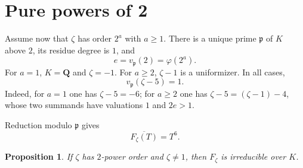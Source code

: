 \documentclass[11pt]{article}
\newtheorem{proposition}[theorem]{Proposition}
\newcommand{\Q}{\mathbf Q}
\begin{document}
\section{Pure powers of 2}
\label{sec:pure-two-base}

Assume now that $\zeta$ has order $2^a$ with $a\geq1$.  There is a
unique prime $\mathfrak p$ of $K$ above $2$, its residue degree is $1$,
and
\[
 e=v_{\mathfrak p}(2)=\varphi(2^a).
\]
For $a=1$, $K=\Q$ and $\zeta=-1$.  For $a\geq2$, $\zeta-1$ is a
uniformizer.  In all cases,
\begin{equation}\label{eq:zeta-5-one}
 v_{\mathfrak p}(\zeta-5)=1.
\end{equation}
Indeed, for $a=1$ one has $\zeta-5=-6$; for $a\geq2$ one has
$\zeta-5=(\zeta-1)-4$, whose two summands have valuations $1$ and
$2e>1$.

Reduction modulo $\mathfrak p$ gives
\begin{equation}\label{eq:pure-reduction}
 \overline{F_\zeta(T)}=T^6.
\end{equation}

\begin{proposition}\label{prop:pure-two}
If $\zeta$ has $2$-power order and $\zeta\neq1$, then $F_\zeta$ is
irreducible over $K$.
\end{proposition}
\end{document}
